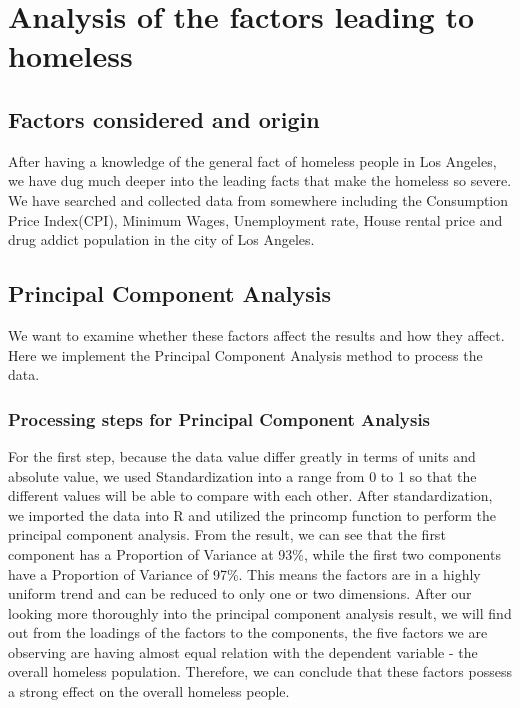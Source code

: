 \documentclass[]{article}
\begin{document}
\hypertarget{analysis-of-the-factors-leading-to-homeless}{%
\section{Analysis of the factors leading to
homeless}\label{analysis-of-the-factors-leading-to-homeless}}

\hypertarget{factors-considered-and-origin}{%
\subsection{Factors considered and
origin}\label{factors-considered-and-origin}}

After having a knowledge of the general fact of homeless people in Los
Angeles, we have dug much deeper into the leading facts that make the
homeless so severe. We have searched and collected data from somewhere
including the Consumption Price Index(CPI), Minimum Wages, Unemployment
rate, House rental price and drug addict population in the city of Los
Angeles.

\hypertarget{principal-component-analysis}{%
\subsection{Principal Component
Analysis}\label{principal-component-analysis}}

We want to examine whether these factors affect the results and how they
affect. Here we implement the Principal Component Analysis method to
process the data.

\hypertarget{processing-steps-for-principal-component-analysis}{%
\subsubsection{Processing steps for Principal Component
Analysis}\label{processing-steps-for-principal-component-analysis}}

For the first step, because the data value differ greatly in terms of
units and absolute value, we used Standardization into a range from 0 to
1 so that the different values will be able to compare with each other.
After standardization, we imported the data into R and utilized the
princomp function to perform the principal component analysis. From the
result, we can see that the first component has a Proportion of Variance
at 93\%, while the first two components have a Proportion of Variance of
97\%. This means the factors are in a highly uniform trend and can be
reduced to only one or two dimensions. After our looking more thoroughly
into the principal component analysis result, we will find out from the
loadings of the factors to the components, the five factors we are
observing are having almost equal relation with the dependent variable -
the overall homeless population. Therefore, we can conclude that these
factors possess a strong effect on the overall homeless people.
\end{document}
